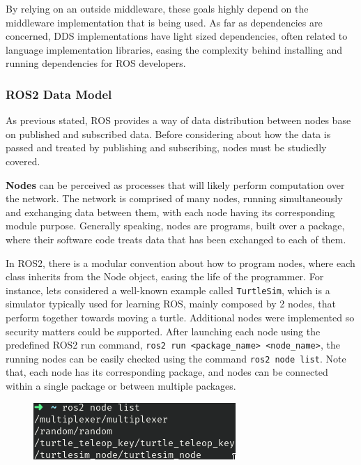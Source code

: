 By relying on an outside middleware, these goals highly depend on the middleware implementation that is being used. As far as dependencies are concerned, DDS implementations have light sized dependencies, often related to language implementation libraries, easing the complexity behind installing and running dependencies for ROS developers.


\subsubsection{ROS2 Data Model}

As previous stated, ROS provides a way of data distribution between nodes base on published and subscribed data. Before considering about how the data is passed and treated by publishing and subscribing, nodes must be studiedly covered.
            
\textbf{Nodes} can be perceived as processes that will likely perform computation over the network. The network is comprised of many nodes, running simultaneously and exchanging data between them, with each node having its corresponding module purpose. Generally speaking, nodes are programs, built over a package, where their software code treats data that has been exchanged to each of them.

In ROS2, there is a modular convention about how to program nodes, where each class inherits from the Node object, easing the life of the programmer.        
For instance, lets considered a well-known example called \texttt{TurtleSim}, which is a simulator typically used for learning ROS, mainly composed by 2 nodes, that perform together towards moving a turtle. Additional nodes were implemented so security matters could be supported. After launching each node using the predefined ROS2 run command, \texttt{ros2 run <package\_name> <node\_name>}, the running nodes can be easily checked using the command \texttt{ros2 node list}. Note that, each node has its corresponding package, and nodes can be connected within a single package or between multiple packages.

\begin{figure}[H]
        \centering
         \includegraphics[width=0.4\linewidth]{images/ts_nodelist.png}
\end{figure}
    

